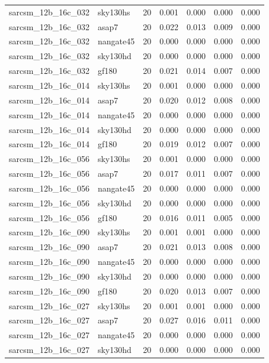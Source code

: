\begin{tabular}{llrrrrr}
sarcsm\_12b\_16c\_032 & sky130hs & 20 & 0.001 & 0.000 & 0.000 & 0.000 \\
sarcsm\_12b\_16c\_032 & asap7 & 20 & 0.022 & 0.013 & 0.009 & 0.000 \\
sarcsm\_12b\_16c\_032 & nangate45 & 20 & 0.000 & 0.000 & 0.000 & 0.000 \\
sarcsm\_12b\_16c\_032 & sky130hd & 20 & 0.000 & 0.000 & 0.000 & 0.000 \\
sarcsm\_12b\_16c\_032 & gf180 & 20 & 0.021 & 0.014 & 0.007 & 0.000 \\
sarcsm\_12b\_16c\_014 & sky130hs & 20 & 0.001 & 0.000 & 0.000 & 0.000 \\
sarcsm\_12b\_16c\_014 & asap7 & 20 & 0.020 & 0.012 & 0.008 & 0.000 \\
sarcsm\_12b\_16c\_014 & nangate45 & 20 & 0.000 & 0.000 & 0.000 & 0.000 \\
sarcsm\_12b\_16c\_014 & sky130hd & 20 & 0.000 & 0.000 & 0.000 & 0.000 \\
sarcsm\_12b\_16c\_014 & gf180 & 20 & 0.019 & 0.012 & 0.007 & 0.000 \\
sarcsm\_12b\_16c\_056 & sky130hs & 20 & 0.001 & 0.000 & 0.000 & 0.000 \\
sarcsm\_12b\_16c\_056 & asap7 & 20 & 0.017 & 0.011 & 0.007 & 0.000 \\
sarcsm\_12b\_16c\_056 & nangate45 & 20 & 0.000 & 0.000 & 0.000 & 0.000 \\
sarcsm\_12b\_16c\_056 & sky130hd & 20 & 0.000 & 0.000 & 0.000 & 0.000 \\
sarcsm\_12b\_16c\_056 & gf180 & 20 & 0.016 & 0.011 & 0.005 & 0.000 \\
sarcsm\_12b\_16c\_090 & sky130hs & 20 & 0.001 & 0.001 & 0.000 & 0.000 \\
sarcsm\_12b\_16c\_090 & asap7 & 20 & 0.021 & 0.013 & 0.008 & 0.000 \\
sarcsm\_12b\_16c\_090 & nangate45 & 20 & 0.000 & 0.000 & 0.000 & 0.000 \\
sarcsm\_12b\_16c\_090 & sky130hd & 20 & 0.000 & 0.000 & 0.000 & 0.000 \\
sarcsm\_12b\_16c\_090 & gf180 & 20 & 0.020 & 0.013 & 0.007 & 0.000 \\
sarcsm\_12b\_16c\_027 & sky130hs & 20 & 0.001 & 0.001 & 0.000 & 0.000 \\
sarcsm\_12b\_16c\_027 & asap7 & 20 & 0.027 & 0.016 & 0.011 & 0.000 \\
sarcsm\_12b\_16c\_027 & nangate45 & 20 & 0.000 & 0.000 & 0.000 & 0.000 \\
sarcsm\_12b\_16c\_027 & sky130hd & 20 & 0.000 & 0.000 & 0.000 & 0.000 \\

\end{tabular}

